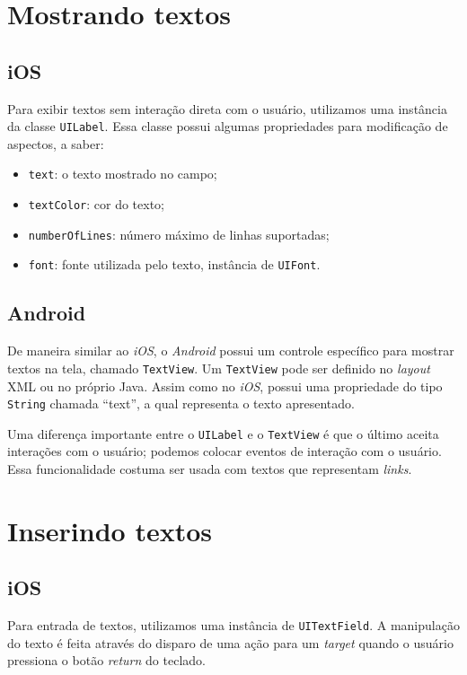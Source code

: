      

    \section {Mostrando textos}
    \subsection{iOS}
    
	Para exibir textos sem interação direta com o usuário, utilizamos uma instância da classe \texttt{UILabel}. Essa classe possui algumas propriedades para modificação de aspectos, a saber:
\begin{itemize}
\item \texttt{text}: o texto mostrado no campo;
\item \texttt{textColor}: cor do texto;
\item \texttt{numberOfLines}: número máximo de linhas suportadas;
\item \texttt{font}: fonte utilizada pelo texto, instância de \texttt{UIFont}.
\end{itemize}     
   
    \subsection{Android}
     
    De maneira similar ao \emph{iOS}, o \emph{Android} possui um controle específico para mostrar textos na tela, chamado \texttt{TextView}. Um \texttt{TextView} pode ser definido no \emph{layout} \ac{XML} ou no próprio Java. Assim como no \emph{iOS}, possui uma propriedade do tipo \texttt{String} chamada ``text'', a qual representa o texto apresentado.%
    
   
    Uma diferença importante entre o \texttt{UILabel} e o \texttt{TextView} é que o último aceita interações com o usuário; podemos colocar eventos de interação com o usuário. Essa funcionalidade costuma ser usada com textos que representam \emph{links}.
     
    \section {Inserindo textos}
     
    \subsection{iOS}
            Para entrada de textos, utilizamos uma instância de \texttt{UITextField}. A manipulação do texto é feita através do disparo de uma ação para um \emph{target} quando o usuário pressiona o botão \emph{return} do teclado.
    
